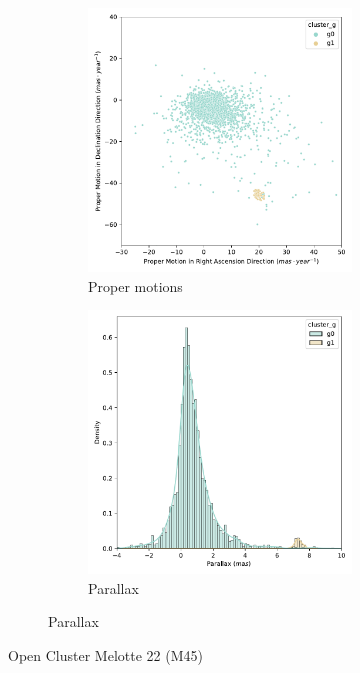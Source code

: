 \documentclass[11pt, a4paper, english]{book}
\begin{document}
\begin{figure}[htbp]
  \centering
  \begin{subfigure}{0.9\textwidth}
    \centering
    \begin{subfigure}[t]{0.45\textwidth}
      \centering
      \includegraphics[width=\textwidth]{../figures/pm_melotte_22.pdf}
      \caption{Proper motions}
      \label{fig:pm_melotte_22}
    \end{subfigure}
    \hfill
    \begin{subfigure}[t]{0.45\textwidth}
      \centering
      \includegraphics[width=\textwidth]{../figures/parallax_melotte_22.pdf}
      \caption{Parallax}
      \label{fig:pm_vec_melotte_22}
    \end{subfigure}
  \end{subfigure}
  \caption{Open Cluster Melotte 22 (M45)}
\end{figure}
\end{document}
